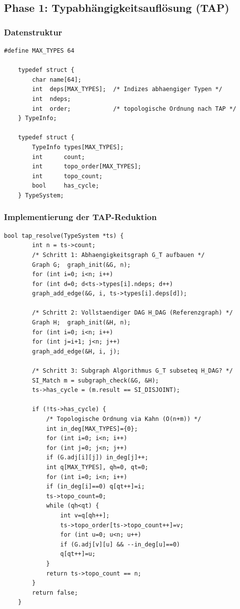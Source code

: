 ﻿\documentclass[a4paper,12pt]{article}
\theoremstyle{definition}
\begin{document}
\subsection{Phase 1: Typabhängigkeitsauflösung (TAP)}
\label{sec:impl-tap}

\subsubsection{Datenstruktur}

\begin{lstlisting}[style=cstyle, caption={Typsystem (compiler.h)},
	label=lst:tap-ds]
	#define MAX_TYPES 64
	
	typedef struct {
		char name[64];
		int  deps[MAX_TYPES];  /* Indizes abhaengiger Typen */
		int  ndeps;
		int  order;            /* topologische Ordnung nach TAP */
	} TypeInfo;
	
	typedef struct {
		TypeInfo types[MAX_TYPES];
		int      count;
		int      topo_order[MAX_TYPES];
		int      topo_count;
		bool     has_cycle;
	} TypeSystem;
\end{lstlisting}

\subsubsection{Implementierung der TAP-Reduktion}

\begin{lstlisting}[style=cstyle, caption={TAP -- Reduktion auf SI
		(compiler\_full.c)}, label=lst:tap-impl]
	bool tap_resolve(TypeSystem *ts) {
		int n = ts->count;
		/* Schritt 1: Abhaengigkeitsgraph G_T aufbauen */
		Graph G;  graph_init(&G, n);
		for (int i=0; i<n; i++)
		for (int d=0; d<ts->types[i].ndeps; d++)
		graph_add_edge(&G, i, ts->types[i].deps[d]);
		
		/* Schritt 2: Vollstaendiger DAG H_DAG (Referenzgraph) */
		Graph H;  graph_init(&H, n);
		for (int i=0; i<n; i++)
		for (int j=i+1; j<n; j++)
		graph_add_edge(&H, i, j);
		
		/* Schritt 3: Subgraph Algorithmus G_T subseteq H_DAG? */
		SI_Match m = subgraph_check(&G, &H);
		ts->has_cycle = (m.result == SI_DISJOINT);
		
		if (!ts->has_cycle) {
			/* Topologische Ordnung via Kahn (O(n+m)) */
			int in_deg[MAX_TYPES]={0};
			for (int i=0; i<n; i++)
			for (int j=0; j<n; j++)
			if (G.adj[i][j]) in_deg[j]++;
			int q[MAX_TYPES], qh=0, qt=0;
			for (int i=0; i<n; i++)
			if (in_deg[i]==0) q[qt++]=i;
			ts->topo_count=0;
			while (qh<qt) {
				int v=q[qh++];
				ts->topo_order[ts->topo_count++]=v;
				for (int u=0; u<n; u++)
				if (G.adj[v][u] && --in_deg[u]==0)
				q[qt++]=u;
			}
			return ts->topo_count == n;
		}
		return false;
	}
\end{lstlisting}
\end{document}
